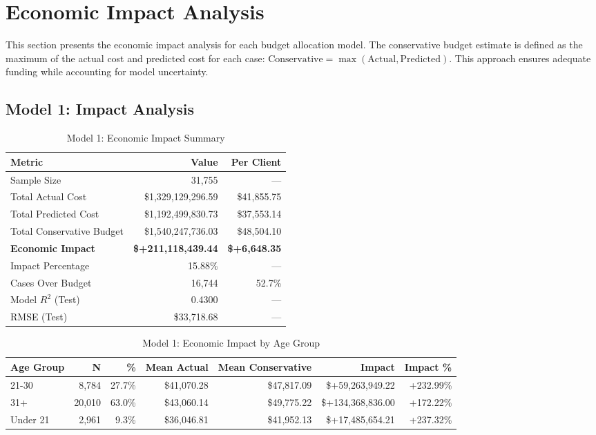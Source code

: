 
\section{Economic Impact Analysis}
\label{sec:economic_impact}

This section presents the economic impact analysis for each budget allocation model. The conservative budget estimate is defined as the maximum of the actual cost and predicted cost for each case: $\text{Conservative} = \max(\text{Actual}, \text{Predicted})$. This approach ensures adequate funding while accounting for model uncertainty.

\subsection{Model 1: Impact Analysis}
\label{subsec:model1_impact}

\begin{table}[htbp]
\centering
\small
\caption{Model 1: Economic Impact Summary}
\label{tab:model1_impact_summary}
\begin{tabular}{lrr}
\toprule
\textbf{Metric} & \textbf{Value} & \textbf{Per Client} \\
\midrule
Sample Size & 31,755 & --- \\
\midrule
Total Actual Cost & \$1,329,129,296.59 & \$41,855.75 \\
Total Predicted Cost & \$1,192,499,830.73 & \$37,553.14 \\
Total Conservative Budget & \$1,540,247,736.03 & \$48,504.10 \\
\midrule
\textbf{Economic Impact} & \textbf{\$+211,118,439.44} & \textbf{\$+6,648.35} \\
Impact Percentage & 15.88\% & --- \\
\midrule
Cases Over Budget & 16,744 & 52.7\% \\
\midrule
Model $R^2$ (Test) & 0.4300 & --- \\
RMSE (Test) & \$33,718.68 & --- \\
\bottomrule
\end{tabular}
\end{table}

\begin{table}[htbp]
\centering
\small
\caption{Model 1: Economic Impact by Age Group}
\label{tab:model1_impact_age}
\begin{tabular}{lrrrrrr}
\toprule
\textbf{Age Group} & \textbf{N} & \textbf{\%} & \textbf{Mean Actual} & \textbf{Mean Conservative} & \textbf{Impact} & \textbf{Impact \%} \\
\midrule
21-30 & 8,784 & 27.7\% & \$41,070.28 & \$47,817.09 & \$+59,263,949.22 & +232.99\% \\
31+ & 20,010 & 63.0\% & \$43,060.14 & \$49,775.22 & \$+134,368,836.00 & +172.22\% \\
Under 21 & 2,961 & 9.3\% & \$36,046.81 & \$41,952.13 & \$+17,485,654.21 & +237.32\% \\
\bottomrule
\end{tabular}
\end{table}

